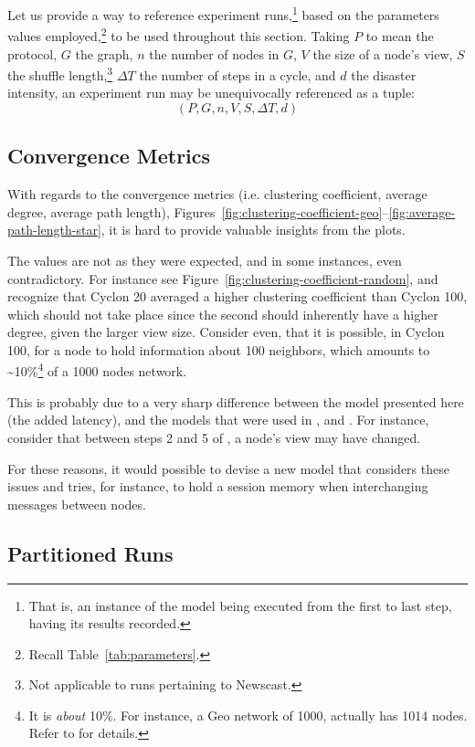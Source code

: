 \documentclass[a4paper]{ifacconf}
\newcommand{\DT}{\ensuremath{{\Delta}T}}
\begin{document}
Let us provide a way to reference experiment runs,\footnote{%
    That is, an instance of the model being executed from the first to last step, having its results recorded.
} based on the parameters values employed,\footnote{%
Recall Table~\ref{tab:parameters}.
} to be used throughout this section.
Taking $P$ to mean the protocol, $G$ the graph, $n$ the number of nodes in $G$, $V$ the size of a node's view, $S$ the shuffle length,\footnote{%
    Not applicable to runs pertaining to Newscast.
} $\DT$ the number of steps in a cycle, and $d$ the disaster intensity, an experiment run may be unequivocally referenced as a tuple:
$$
(P, G, n, V, S, \DT, d)
$$

\subsection{Convergence Metrics}

With regards to the convergence metrics (i.e. clustering coefficient, average degree, average path length), Figures~\ref{fig:clustering-coefficient-geo}--\ref{fig:average-path-length-star}, it is hard to provide valuable insights from the plots.

The values are not as they were expected, and in some instances, even contradictory.
For instance see Figure~\ref{fig:clustering-coefficient-random}, and recognize that Cyclon 20 averaged a higher clustering coefficient than Cyclon 100, which should not take place since the second should inherently have a higher degree, given the larger view size.
Consider even, that it is possible, in Cyclon 100, for a node to hold information about 100 neighbors, which amounts to \textasciitilde10\%\footnote{%
    It is \emph{about} 10\%.
    For instance, a Geo network of 1000, actually has 1014 nodes.
    Refer to \cite[\texttt{graph.py}]{implementation} for details.
} of a 1000 nodes network.

This is probably due to a very sharp difference between the model presented here (the added latency), and the models that were used in \cite{newscast}, and \cite{cyclon}.
For instance, consider that between steps 2 and 5 of \cite[\S2.2]{cyclon}, a node's view may have changed.

For these reasons, it would possible to devise a new model that considers these issues and tries, for instance, to hold a session memory when interchanging messages between nodes.

\subsection{Partitioned Runs}\label{sec:partitioned}
\end{document}
